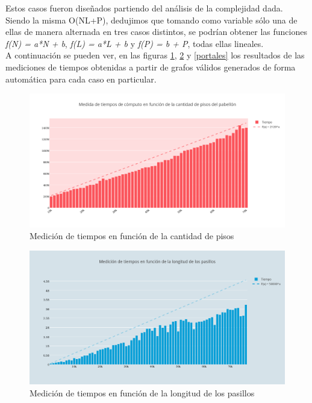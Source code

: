 Estos casos fueron diseñados partiendo del análisis de la complejidad dada. Siendo la misma O(NL+P), dedujimos que tomando como variable sólo una de ellas de manera alternada en tres casos distintos, se podrían obtener las funciones \textit{ f(N) = a*N + b},  \textit {f(L) = a*L + b} y \textit{f(P) = b + P}, todas ellas lineales. \\

A continuación se pueden ver, en las figuras \ref{pisos}, \ref{pasillos} y \ref{portales} los resultados de las mediciones de tiempos obtenidas a partir de grafos válidos  generados de forma automática para cada caso en particular.


\begin{figure}[h!]
   \begin{center}
 	\includegraphics[width=18cm]{imagenes/ej2/f(pisos).png}
	\caption{Medición de tiempos en función de la cantidad de pisos}
	\label{pisos}
   \end{center}
 \end{figure}

 \begin{figure}[h!]
   \begin{center}
 	\includegraphics[width=18cm]{imagenes/ej2/f(pasillos).png}
	\caption{Medición de tiempos en función de la longitud de los pasillos}
	\label{pasillos}
   \end{center}
 \end{figure}

